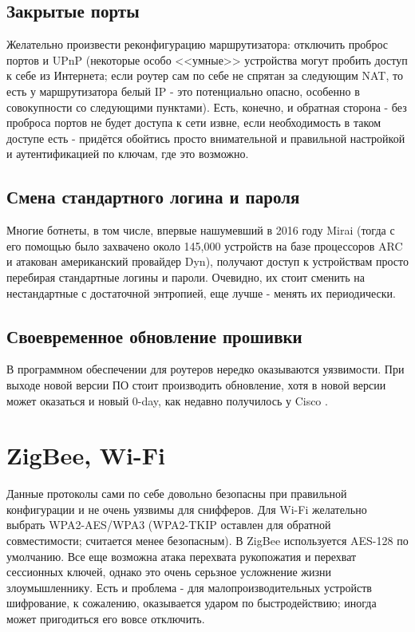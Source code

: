 \documentclass{article}
\begin{document}
\subsection{Закрытые порты}
Желательно произвести реконфигурацию маршрутизатора: отключить проброс портов и UPnP (некоторые особо <<умные>> устройства могут пробить доступ к себе из Интернета; если роутер сам по себе не спрятан за следующим NAT, то есть у маршрутизатора белый IP - это потенциально опасно, особенно в совокупности со следующими пунктами). Есть, конечно, и обратная сторона - без проброса портов не будет доступа к сети извне, если необходимость в таком доступе есть - придётся обойтись просто внимательной и правильной настройкой и аутентификацией по ключам, где это возможно.

\subsection{Смена стандартного логина и пароля}
Многие ботнеты, в том числе, впервые нашумевший в 2016 году Mirai \cite{mirai} (тогда с его помощью было захвачено около 145,000 устройств на базе процессоров ARC и атакован американский провайдер Dyn), получают доступ к устройствам просто перебирая стандартные логины и пароли. Очевидно, их стоит сменить на нестандартные с достаточной энтропией, еще лучше - менять их периодически. 

\subsection{Своевременное обновление прошивки}
В программном обеспечении для роутеров нередко оказываются уязвимости. При выходе новой версии ПО стоит производить обновление, хотя в новой версии может оказаться и новый 0-day, как недавно получилось у Cisco \cite{zeroday}.

\section{ZigBee, Wi-Fi}
Данные протоколы сами по себе довольно безопасны при правильной конфигурации и не очень уязвимы для снифферов. Для Wi-Fi желательно выбрать WPA2-AES/WPA3 (WPA2-TKIP оставлен для обратной совместимости; считается менее безопасным). В ZigBee используется AES-128 по умолчанию. Все еще возможна атака перехвата рукопожатия и перехват сессионных ключей, однако это очень серьзное усложнение жизни злоумышленнику. Есть и проблема - для малопроизводительных устройств шифрование, к сожалению, оказывается ударом по быстродействию; иногда может пригодиться его вовсе отключить.
\end{document}
